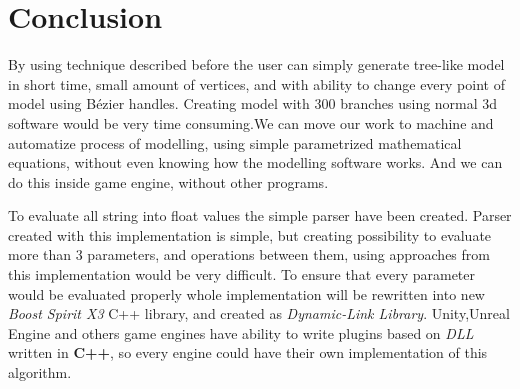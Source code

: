 \documentclass[b5paper,twoside,11pt]{article}
\begin{document}
\section{Conclusion}
By using technique described before the user can simply generate tree-like model in short time, small amount of vertices, and with ability to change every point of model using Bézier handles. Creating model with 300 branches using normal 3d  software would be very time consuming.We can move our work to machine and automatize process of modelling, using simple parametrized mathematical equations, without even knowing how the modelling software works. And we can do this inside game engine, without other programs.

To evaluate all string into float values the simple parser have been created.
Parser created with this implementation is simple, but creating possibility to evaluate more than 3 parameters, and operations between them, using approaches from this implementation would be very difficult. To ensure that every parameter would be evaluated properly whole implementation will be rewritten into new \textit{Boost Spirit X3} C++ library, and created as \textit{Dynamic-Link Library}. Unity,Unreal Engine and others game engines have ability to write plugins based on \textit{DLL} written in \textbf{C++}, so every engine could have their own implementation of this algorithm.
\end{document}
